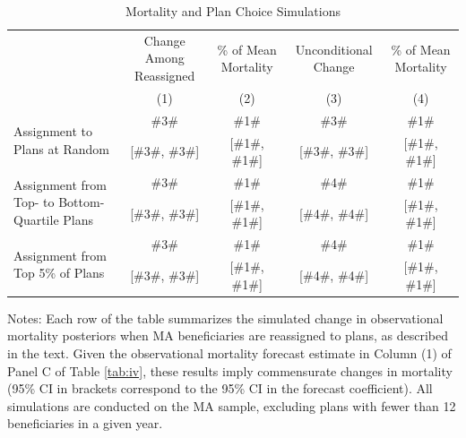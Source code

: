 \begin{table}[h]
\caption{\label{tab:counterfactuals}Mortality and Plan Choice Simulations}
\vspace{-0.5cm}
\begin{center}
  \begin{tabular}{p{4.25cm} cccc}
\toprule
& \multirow{3}{2.7cm}{\centering Change Among Reassigned}
& \multirow{3}{2cm}{\centering \% of Mean Mortality}
& \multirow{3}{2.7cm}{\centering Unconditional Change}
& \multirow{3}{2cm}{\centering \% of Mean Mortality}
\\\\\\
& (1) & (2) & (3) & (4)
\\\midrule
\multirow{2}{4.75cm}{Assignment to Plans at Random}                   & \#3\#          & \#1\#        & \#3\#          & \#1\#          \\
                                                                      & [\#3\#, \#3\#] & [\#1\#, \#1\#] & [\#3\#, \#3\#] & [\#1\#, \#1\#] \\[18pt]
\multirow{2}{4.75cm}{Assignment from Top- to Bottom-Quartile Plans}   & \#3\#          & \#1\#          & \#4\#          & \#1\#          \\
                                                                      & [\#3\#, \#3\#] & [\#1\#, \#1\#] & [\#4\#, \#4\#] & [\#1\#, \#1\#] \\[18pt]
\multirow{2}{4.75cm}{Assignment from Top 5\% of Plans}                & \#3\#          & \#1\#          & \#4\#          & \#1\#          \\
                                                                      & [\#3\#, \#3\#] & [\#1\#, \#1\#] & [\#4\#, \#4\#] & [\#1\#, \#1\#] \\
\bottomrule
\end{tabular}
\end{center}

{\footnotesize{}Notes: Each row of the table summarizes the simulated change in observational mortality posteriors when MA beneficiaries are reassigned to plans, as described in the text. Given the observational mortality forecast estimate in Column (1) of Panel C of Table \ref{tab:iv}, these results imply commensurate changes in mortality (95\% CI in brackets correspond to the 95\% CI in the forecast coefficient). All simulations are conducted on the MA sample, excluding plans with fewer than 12 beneficiaries in a given year.}
{\footnotesize\par}
\end{table}
